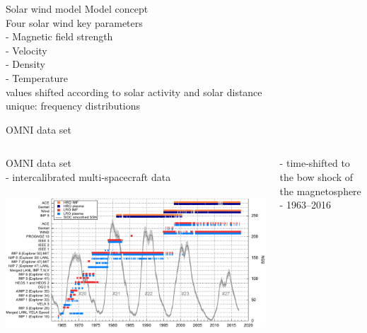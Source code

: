 \begin{frame}[c]{Solar wind model}{}
	Model concept\\
	Four solar wind key parameters\\
	- Magnetic field strength\\
	- Velocity\\
	- Density\\
	- Temperature\\
	
	values shifted according to solar activity and solar distance\\
	unique: frequency distributions
\end{frame}
\begin{frame}[c]{OMNI data set}{}
	\begin{columns}[c]
		
		OMNI data set \citep{King2005}\\
		- intercalibrated multi-spacecraft data\\\ 
		\includegraphics[width=\textwidth]{../figures_of_mine/gnuplots/timeline_OMNI_SC_IDs.pdf}
		
		
		- time-shifted to the bow shock of the magnetosphere\\
		- 1963--2016\\
		
	\end{columns}
\end{frame}
